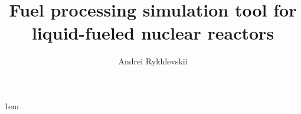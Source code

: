 \documentclass[edeposit,fullpage,12pt]{uiucthesis2009}
\title{Fuel processing simulation tool for liquid-fueled nuclear reactors}
\author{Andrei Rykhlevskii}
\begin{document}

%
\maketitle

\parindent 1em%

\frontmatter

%
%

%

%
%
%
\tableofcontents

%

%

%
\end{document}
